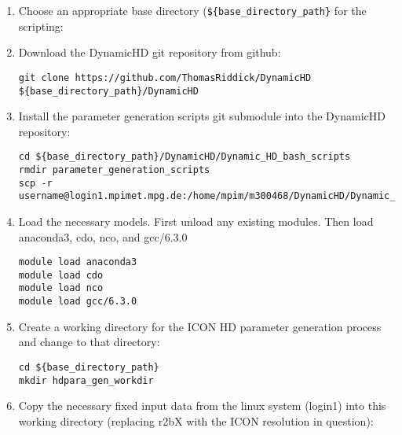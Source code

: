 \documentclass{article}
\begin{document}
%
%

\begin{enumerate}
\item Choose an appropriate base directory (\lstinline[style=bash_input]|${base_directory_path}| for the scripting:

\item Download the DynamicHD git repository from github:
\begin{lstlisting}[style=bash_input,breaklines=true]
git clone https://github.com/ThomasRiddick/DynamicHD ${base_directory_path}/DynamicHD
\end{lstlisting}
\item Install the parameter generation scripts git submodule into the DynamicHD repository:
\begin{lstlisting}[style=bash_input,breaklines=true] 
cd ${base_directory_path}/DynamicHD/Dynamic_HD_bash_scripts
rmdir parameter_generation_scripts
scp -r  username@login1.mpimet.mpg.de:/home/mpim/m300468/DynamicHD/Dynamic_HD_bash_scripts/parameter_generation_scripts
\end{lstlisting}

\item Load the necessary models. First unload any existing modules. Then load anaconda3, cdo, nco, and gcc/6.3.0

\begin{lstlisting}[style=bash_input,breaklines=true] 
module load anaconda3
module load cdo
module load nco
module load gcc/6.3.0
\end{lstlisting}


\item Create a working directory for the ICON HD parameter generation process and change to that directory:
\begin{lstlisting}[style=bash_input,breaklines=true] 
cd ${base_directory_path}
mkdir hdpara_gen_workdir
\end{lstlisting}

\item Copy the necessary fixed input data from the linux system (login1) into this working directory (replacing r2bX with the ICON resolution in question):


\end{enumerate}
\end{document}
